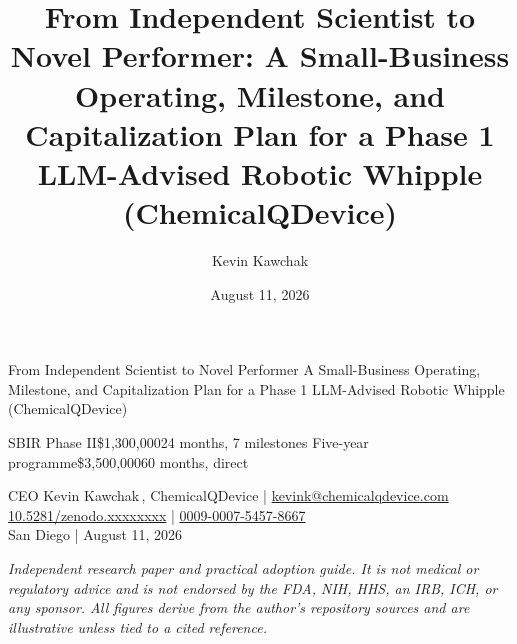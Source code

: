 \documentclass[11pt]{article}
\title{From Independent Scientist to Novel Performer: A Small-Business
Operating, Milestone, and Capitalization Plan for a Phase 1 LLM-Advised Robotic
Whipple (ChemicalQDevice)}
\author{Kevin Kawchak}
\date{August 11, 2026}
\begin{document}
\thispagestyle{plain}

%
{From Independent Scientist to Novel Performer}%
{A Small-Business Operating, Milestone, and Capitalization Plan for a Phase 1
LLM-Advised Robotic Whipple (ChemicalQDevice)}

\vspace{0.15em}

\begin{center}
 \enspace {} \enspace
{} \enspace {}
\end{center}

\vspace{-0.15em}

%
{SBIR Phase II}{\$1,300,000}{24 months, 7 milestones}%
{Five-year programme}{\$3,500,000}{60 months, direct}

\vspace{-0.1em}
\apprule{0.9pt}

\begin{center}\small
CEO Kevin Kawchak\,, ChemicalQDevice \;|\;
\href{mailto:kevink@chemicalqdevice.com}{kevink@chemicalqdevice.com}\\
\href{https://doi.org/10.5281/zenodo.xxxxxxxx}{10.5281/zenodo.xxxxxxxx} \;|\;
\href{https://orcid.org/0009-0007-5457-8667}{0009-0007-5457-8667}\\
San Diego \;|\; August 11, 2026
\end{center}

\vspace{-0.25em}
\apprule{0.5pt}

\noindent\footnotesize\textit{Independent research paper and practical adoption
guide. It is not medical or regulatory advice and is not endorsed by the FDA,
NIH, HHS, an IRB, ICH, or any sponsor. All figures derive from the author's
repository sources and are illustrative unless tied to a cited
reference.}\normalsize\par
\end{document}
